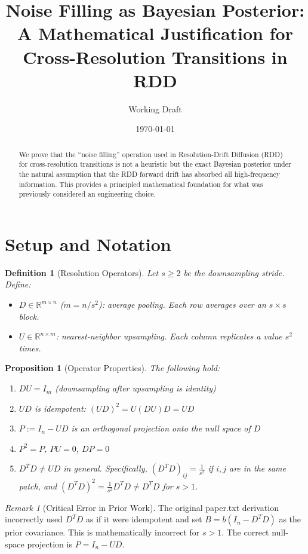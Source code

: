\documentclass[11pt]{article}
\title{Noise Filling as Bayesian Posterior:\\A Mathematical Justification for Cross-Resolution Transitions in RDD}
\author{Working Draft}
\date{\today}
\newtheorem{proposition}[theorem]{Proposition}
\newtheorem{definition}[theorem]{Definition}
\theoremstyle{remark}
\newtheorem{remark}[theorem]{Remark}
\begin{document}
\maketitle

\begin{abstract}
We prove that the ``noise filling'' operation used in Resolution-Drift Diffusion (RDD) for cross-resolution transitions is not a heuristic but the exact Bayesian posterior under the natural assumption that the RDD forward drift has absorbed all high-frequency information. This provides a principled mathematical foundation for what was previously considered an engineering choice.
\end{abstract}

\section{Setup and Notation}

\begin{definition}[Resolution Operators]
Let $s \geq 2$ be the downsampling stride. Define:
\begin{itemize}
    \item $D \in \mathbb{R}^{m \times n}$ ($m = n/s^2$): average pooling. Each row averages over an $s \times s$ block.
    \item $U \in \mathbb{R}^{n \times m}$: nearest-neighbor upsampling. Each column replicates a value $s^2$ times.
\end{itemize}
\end{definition}

\begin{proposition}[Operator Properties]\label{prop:ops}
The following hold:
\begin{enumerate}
    \item $DU = I_m$ (downsampling after upsampling is identity)
    \item $UD$ is idempotent: $(UD)^2 = U(DU)D = UD$
    \item $P := I_n - UD$ is an orthogonal projection onto the null space of $D$
    \item $P^2 = P$, $PU = 0$, $DP = 0$
    \item $D^T D \neq UD$ in general. Specifically, $(D^TD)_{ij} = \frac{1}{s^2}$ if $i,j$ are in the same patch, and $(D^TD)^2 = \frac{1}{s^2}D^TD \neq D^TD$ for $s > 1$.
\end{enumerate}
\end{proposition}

\begin{remark}[Critical Error in Prior Work]
The original paper.txt derivation incorrectly used $D^TD$ as if it were idempotent and set $B = b(I_n - D^TD)$ as the prior covariance. This is mathematically incorrect for $s > 1$. The correct null-space projection is $P = I_n - UD$.
\end{remark}
\end{document}
